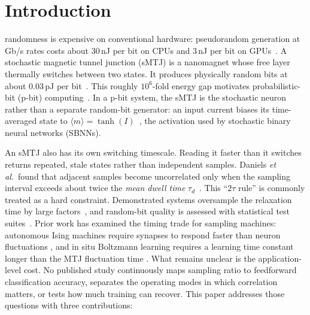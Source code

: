 \documentclass{ieeeaccess}
\begin{document}
\titlepgskip=-21pt

\maketitle

\section{Introduction}
 randomness is expensive on conventional
hardware: pseudorandom generation at Gb/s rates costs about 30\,nJ per bit
on CPUs and 3\,nJ per bit on GPUs~\cite{sun2026superparamagnetic}. A
stochastic magnetic tunnel junction (sMTJ) is a nanomagnet whose free layer
thermally switches between two states. It produces physically random bits at
about 0.03\,pJ per bit~\cite{sun2026superparamagnetic}. This roughly
$10^6$-fold energy gap motivates probabilistic-bit (p-bit)
computing~\cite{camsari2017stochastic,kaiser2021probabilistic}. In a p-bit
system, the sMTJ is the stochastic neuron rather than a separate random-bit
generator: an input current biases its time-averaged state to
$\langle m \rangle = \tanh(I)$~\cite{camsari2017stochastic}, the activation
used by stochastic binary neural networks (SBNNs).

An sMTJ also has its own switching timescale. Reading it faster than it
switches returns repeated, stale states rather than independent samples.
Daniels \emph{et al.}\ found that adjacent samples become uncorrelated only
when the sampling interval exceeds about twice the \emph{mean dwell time}
$\tau_d$~\cite{daniels2020energy}. This ``$2\tau$ rule'' is commonly treated
as a hard constraint. Demonstrated systems oversample the relaxation time by
large factors~\cite{singh2024cmos}, and random-bit quality is assessed with
statistical test suites~\cite{vodenicarevic2017low,sun2026superparamagnetic}.
Prior work has examined the timing trade for sampling machines: autonomous
Ising machines require synapses to respond faster than neuron fluctuations
\cite{sutton2020autonomous}, and in situ Boltzmann learning requires a
learning time constant longer than the MTJ fluctuation time
\cite{kaiser2022hardware}. What remains unclear is the application-level
cost. No published study continuously maps sampling ratio to feedforward
classification accuracy, separates the operating modes in which correlation
matters, or tests how much training can recover. This paper addresses those
questions with three contributions:
\end{document}
